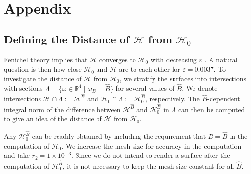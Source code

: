 \documentclass{ws-ijbc}
\begin{document}
\newpage

\section{Appendix}

\subsection*{Defining the Distance of $\mathscr{H}$ from $\mathscr{H}_0$}

Fenichel theory implies that $\mathscr{H}$ converges to $\mathscr{H}_0$ with decreasing $\varepsilon$ \cite{Fenichel}.  A natural question is then how close $\mathscr{H}_0$ and $\mathscr{H}$ are to each other for $\varepsilon=0.0037$.  To investigate the distance of $\mathscr{H}$ from $\mathscr{H}_0$, we stratify the surfaces into intersections with sections $\Lambda = \{ \omega \in \mathbb{R}^4 \; | \; \omega_B = \widehat{B}\}$ for several values of $\widehat{B}$.  We denote intersections $\mathscr{H} \cap \Lambda := \mathscr{H}^{\widehat{B}}$ and $\mathscr{H}_0 \cap \Lambda := \mathscr{H}_0^{\widehat{B}}$, respectively.  The $\widehat{B}$-dependent integral norm of the difference between $\mathscr{H}^{\widehat{B}}$ and $\mathscr{H}_0^{\widehat{B}}$  in $\Lambda$ can then be computed to give an idea of the distance of $\mathscr{H}$ from $\mathscr{H}_0$.

Any $\mathscr{H}_0^{\widehat{B}}$ can be readily obtained by including the requirement that $B=\widehat{B}$ in the computation of $\mathscr{H}_0$.  We increase the mesh size for accuracy in the computation and take $r_2=1\times10^{-3}$.  Since we do not intend to render a surface after the computation of $\mathscr{H}_0^{\widehat{B}}$, it is not necessary to keep the mesh size constant for all $\widehat{B}$.
\end{document}
